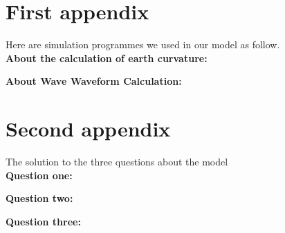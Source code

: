 \documentclass{mcmthesis}
\begin{document}
\begin{appendices}%

\section{First appendix}


Here are simulation programmes we used in our model as follow.\\

\textbf{\textcolor[rgb]{0.98,0.00,0.00}{About the calculation of earth curvature:}}


\textbf{\textcolor[rgb]{0.98,0.00,0.00}{About Wave Waveform Calculation:}}

\section{Second appendix}

The solution to the three questions about the model \\

 \textcolor[rgb]{0.98,0.00,0.00}{\textbf{Question one:}}


 \textcolor[rgb]{0.98,0.00,0.00}{\textbf{Question two:}}


 \textcolor[rgb]{0.98,0.00,0.00}{\textbf{Question three:}}

\end{appendices}
\end{document}
